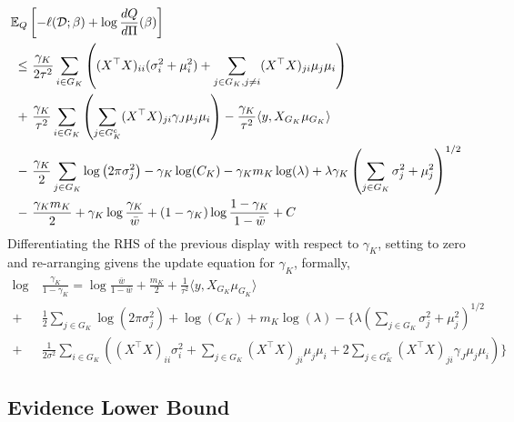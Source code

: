 \documentclass[12pt]{article}
\begin{document}
\begin{equation*}
\begin{aligned}
    \mathbb{E}_{Q} & \left[ 
	- \ell(\mathcal{D}; \beta) + \log \frac{dQ}{d\Pi}(\beta) 
    \right]  \\
\leq &\
    \frac{\gamma_K}{2\tau^2}
    \sum_{i \in G_K} \left( 
	    (X^\top X)_{ii} (\sigma_i^2 + \mu_i^2)
	+
	\sum_{j \in G_K, j\neq i} 
	    (X^\top X)_{ji} \mu_j \mu_i
    \right ) \\
+ &\
    \frac{\gamma_K}{\tau^2}
    \sum_{i \in G_K} \left( 
    \sum_{j \in G_K^c} (X^\top X)_{ji} 
	\gamma_{J} \mu_j \mu_i
    \right )
-
    \frac{\gamma_K}{\tau^2} \langle y, X_{G_K} \mu_{G_K} \rangle \\
- &\
    \frac{\gamma_K}{2} \sum_{j \in G_K} \log \left( 2 \pi \sigma_j^2 \right) 
-
    \gamma_K \log(C_K )
-
    \gamma_K m_K \log (\lambda) 
+
    \lambda \gamma_K \left( \sum_{j \in G_K} 
	\sigma_j^2 + \mu_j^2
    \right)^{1/2} \\
- &\
    \frac{\gamma_K m_K}{2} 
+ 
    \gamma_K \log \frac{\gamma_K}{\bar{w}}
+ 
    (1 - \gamma_K) \log \frac{1 - \gamma_K}{1 - \bar{w}}
+ C
\end{aligned}
\end{equation*}
Differentiating the RHS of the previous display with respect to $\gamma_K$, setting to zero and re-arranging givens the update equation for $\gamma_K$, formally,
\begin{equation} \label{eq:update_gamma} 
\begin{aligned}
    \log &\ \frac{\gamma_K}{1-\gamma_K} = 
    \log \frac{\bar{w}}{1-\bar{w}}
+ 
    \frac{m_K}{2}  
+
    \frac{1}{\tau^2} \langle y, X_{G_K} \mu_{G_K} \rangle  \\
+ &\ 
    \frac{1}{2} \sum_{j \in G_K} \log \left( 2 \pi \sigma_j^2 \right)
+
    \log(C_K )
+
    m_K \log (\lambda)
-
\Bigg\{ 
    \lambda \left( \sum_{j \in G_K} 
	\sigma_j^2 + \mu_j^2
    \right)^{1/2}  \\
+ &\
    \frac{1}{2\sigma^2}
    \sum_{i \in G_K} \left( 
    (X^\top X)_{ii} \sigma_i^2
    +
    \sum_{j \in G_K} 
	(X^\top X)_{ji} \mu_j \mu_i
+
    2 \sum_{j \in G_K^c} (X^\top X)_{ji} 
	\gamma_{J} \mu_j \mu_i
    \right )
\Bigg\}
\end{aligned}
\end{equation}


\subsection{Evidence Lower Bound}
\end{document}
